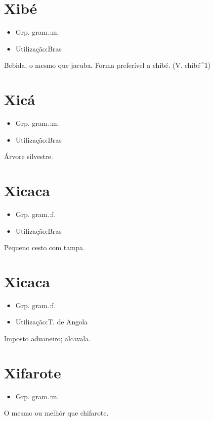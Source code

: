 \section{Xibé}
\begin{itemize}
\item {Grp. gram.:m.}
\end{itemize}
\begin{itemize}
\item {Utilização:Bras}
\end{itemize}
Bebida, o mesmo que \textunderscore jacuba\textunderscore .
Forma preferível a \textunderscore chibé\textunderscore .
(V. \textunderscore chibé\textunderscore ^1)
\section{Xicá}
\begin{itemize}
\item {Grp. gram.:m.}
\end{itemize}
\begin{itemize}
\item {Utilização:Bras}
\end{itemize}
Árvore silvestre.
\section{Xicaca}
\begin{itemize}
\item {Grp. gram.:f.}
\end{itemize}
\begin{itemize}
\item {Utilização:Bras}
\end{itemize}
Pequeno cesto com tampa.
\section{Xicaca}
\begin{itemize}
\item {Grp. gram.:f.}
\end{itemize}
\begin{itemize}
\item {Utilização:T. de Angola}
\end{itemize}
Imposto aduaneiro; alcavala.
\section{Xifarote}
\begin{itemize}
\item {Grp. gram.:m.}
\end{itemize}
O mesmo ou melhór que \textunderscore chifarote\textunderscore .
